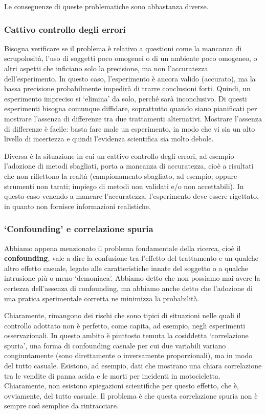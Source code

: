 \documentclass[a4paper,12pt,oneside]{book}
\theoremstyle{definition}
\theoremstyle{definition}
\theoremstyle{definition}
\theoremstyle{remark}
\begin{document}
Le conseguenze di queste problematiche sono abbastanza diverse.

\subsubsection{Cattivo controllo degli
errori}\label{cattivo-controllo-degli-errori}

Bisogna verificare se il problema è relativo a questioni come la
mancanza di scrupolosità, l'uso di soggetti poco omogenei o di un
ambiente poco omogeneo, o altri aspetti che inficiano solo la
precisione, ma non l'accuratezza dell'esperimento. In questo caso,
l'esperimento è ancora valido (accurato), ma la bassa precisione
probabilmente impedirà di trarre conclusioni forti. Quindi, un
esperimento impreciso si `elimina' da solo, perché sarà inconclusivo. Di
questi esperimenti bisogna comunque diffidare, soprattutto quando siano
pianificati per mostrare l'assenza di differenze tra due trattamenti
alternativi. Mostrare l'assenza di differenze è facile: basta fare male
un esperimento, in modo che vi sia un alto livello di incertezza e
quindi l'evidenza scientifica sia molto debole.

Diversa è la situazione in cui un cattivo controllo degli errori, ad
esempio l'adozione di metodi sbagliati, porta a mancanza di accuratezza,
cioè a risultati che non riflettono la realtà (campionamento sbagliato,
ad esempio; oppure strumenti non tarati; impiego di metodi non validati
e/o non accettabili). In questo caso venendo a mancare l'accuratezza,
l'esperimento deve essere rigettato, in quanto non fornisce informazioni
realistiche.

\subsubsection{\texorpdfstring{`Confounding' e correlazione
spuria}{Confounding e correlazione spuria}}\label{confounding-e-correlazione-spuria}

Abbiamo appena menzionato il problema fondamentale della ricerca, cioè
il \textbf{confounding}, vale a dire la confusione tra l'effetto del
trattamento e un qualche altro effetto casuale, legato alle
caratteristiche innate del soggetto o a qualche intrusione più o meno
`demoniaca'. Abbiamo detto che non possiamo mai avere la certezza
dell'assenza di confounding, ma abbiamo anche detto che l'adozione di
una pratica sperimentale corretta ne minimizza la probabilità.

Chiaramente, rimangono dei rischi che sono tipici di situazioni nelle
quali il controllo adottato non è perfetto, come capita, ad esempio,
negli esperimenti osservazionali. In questo ambito è piuttosto temuta la
cosiddetta `correlazione spuria', una forma di confounding casuale per
cui due variabili variano congiuntamente (sono direttamente o
inversamente proporzionali), ma in modo del tutto casuale. Esistono, ad
esempio, dati che mostrano una chiara correlazione tra le vendite di
panna acida e le morti per incidenti in motocicletta. Chiaramente, non
esistono spiegazioni scientifiche per questo effetto, che è, ovviamente,
del tutto casuale. Il problema è che questa correlazione spuria non è
sempre così semplice da rintracciare.
\end{document}
